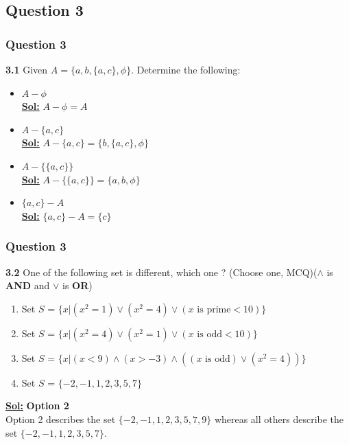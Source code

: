 \documentclass[xcolor=svgnames]{beamer}
\begin{document}
\subsection{Question 3}
\begin{frame}
\frametitle{Question 3}
\textbf{3.1} Given $A = \{a, b, \{a, c\}, \phi \}$. Determine the following:
\begin{itemize}
    \item $A - \phi$ \\
    \textbf{\underline{Sol:}} $A - \phi = A$
    \item $A - \{a, c\}$ \\ 
    \textbf{\underline{Sol:}} $A - \{a, c\} = \{b, \{a, c \}, \phi\}$
    \item $A - \{\{a, c\}\}$ \\
    \textbf{\underline{Sol:}} $A - \{\{a, c\}\} = \{a, b, \phi\}$
    \item $\{a, c\} - A$ \\
    \textbf{\underline{Sol:}} $\{a,c\} - A = \{c\}$
\end{itemize}
\end{frame}
\begin{frame}
\frametitle{Question 3}
\textbf{3.2} One of the following set is different, which one ? (Choose one, MCQ)($\land$ is \textbf{AND} and $\lor$ is \textbf{OR})
\begin{enumerate}
    \item Set $S$ = $\{x |  (x^2 = 1 ) \lor (x^2 = 4) \lor (x \text{ is prime} < 10) \}$
    \item Set $S$ = $\{x| (x^2 = 4) \lor (x^2 = 1) \lor (x \text{ is odd} < 10)\}$
    \item Set $S$ = $\{x | (x < 9) \land (x > -3) \land ((x \text{ is odd}) \lor (x^2 = 4) )\}$
    \item Set $S$ = $\{ -2,-1,1,2,3,5,7 \}$
\end{enumerate}
\vspace{2mm}
\textbf{\underline{Sol:}} \textbf{Option 2} \\ Option 2 describes the set $\{-2, -1, 1, 2, 3, 5, 7, 9\}$ whereas all others describe the set $\{ -2,-1,1,2,3,5,7 \}$.
\end{frame}



\end{document}
